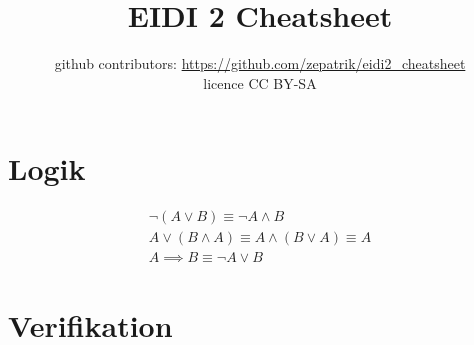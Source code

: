 \documentclass[a4paper,7pt,landscape]{article}
\title{EIDI 2 Cheatsheet}
\author{github contributors: \url{https://github.com/zepatrik/eidi2_cheatsheet} \\
licence CC BY-SA
}
\begin{document}
  \maketitle
  \newpage
  
  \begin{multicols*}{4}
    \section{Logik}
    \begin{align*}
      \neg (A \lor B) \equiv \neg A \land B \\
      A \lor (B \land A) \equiv A \land (B \lor A) \equiv A \\
      A \implies B \equiv \neg A \lor B
    \end{align*}
    
    \section{Verifikation}
    
    
    
  \end{multicols*}
\end{document}
